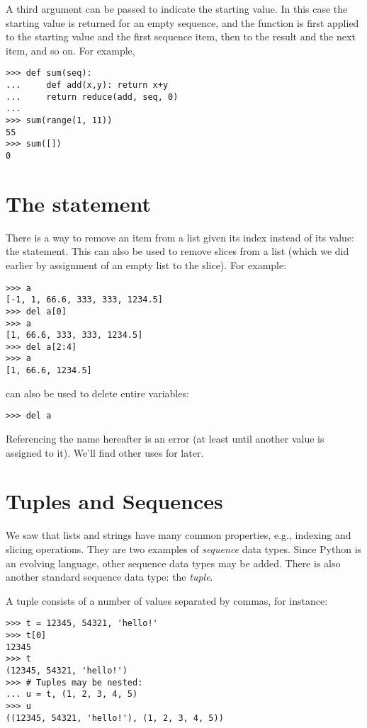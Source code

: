 \documentclass{manual}
\begin{document}
A third argument can be passed to indicate the starting value.  In this
case the starting value is returned for an empty sequence, and the
function is first applied to the starting value and the first sequence
item, then to the result and the next item, and so on.  For example,

\begin{verbatim}
>>> def sum(seq):
...     def add(x,y): return x+y
...     return reduce(add, seq, 0)
... 
>>> sum(range(1, 11))
55
>>> sum([])
0
\end{verbatim}

\section{The  statement \label{del}}

There is a way to remove an item from a list given its index instead
of its value: the  statement.  This can also be used to
remove slices from a list (which we did earlier by assignment of an
empty list to the slice).  For example:

\begin{verbatim}
>>> a
[-1, 1, 66.6, 333, 333, 1234.5]
>>> del a[0]
>>> a
[1, 66.6, 333, 333, 1234.5]
>>> del a[2:4]
>>> a
[1, 66.6, 1234.5]
\end{verbatim}

 can also be used to delete entire variables:

\begin{verbatim}
>>> del a
\end{verbatim}

Referencing the name  hereafter is an error (at least until
another value is assigned to it).  We'll find other uses for
 later.

\section{Tuples and Sequences \label{tuples}}

We saw that lists and strings have many common properties, e.g.,
indexing and slicing operations.  They are two examples of
\emph{sequence} data types.  Since Python is an evolving language,
other sequence data types may be added.  There is also another
standard sequence data type: the \emph{tuple}.

A tuple consists of a number of values separated by commas, for
instance:

\begin{verbatim}
>>> t = 12345, 54321, 'hello!'
>>> t[0]
12345
>>> t
(12345, 54321, 'hello!')
>>> # Tuples may be nested:
... u = t, (1, 2, 3, 4, 5)
>>> u
((12345, 54321, 'hello!'), (1, 2, 3, 4, 5))
\end{verbatim}
\end{document}

